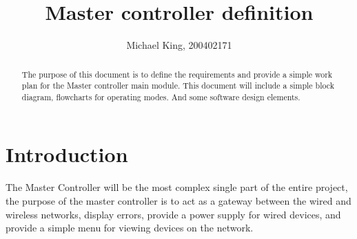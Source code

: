 \documentclass{article}
\begin{document}
	\begin{titlepage}
    	\title{Master controller definition}
    	\author{Michael King, 200402171}
    	\maketitle
    	\thispagestyle{empty}
	\end{titlepage}
    \begin{abstract}
        The purpose of this document is to define the requirements and provide a
         simple work plan for the Master controller main module. This document 
         will include a simple block diagram, flowcharts for operating modes. And some software design elements.
         \newpage
	\end{abstract}
    \section{Introduction}
        The Master Controller will be the most complex single part of the entire
         project, the purpose of the master controller is to act as a gateway
         between the wired and wireless networks, display errors, provide a
         power supply for wired devices, and provide a simple menu for viewing 
         devices on the network.
     
\end{document}
